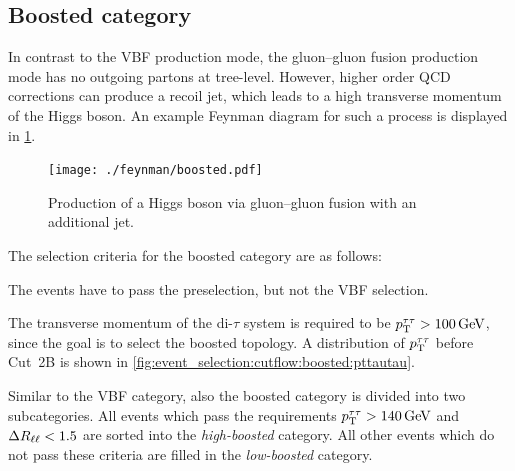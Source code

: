 

\subsection{Boosted category}\label{sub:event_selection:boosted}

In contrast to the VBF production mode, the gluon--gluon fusion production mode has no outgoing partons at tree-level.
However, higher order QCD corrections can produce a recoil jet, which leads to a high transverse momentum of the Higgs boson.
An example Feynman diagram for such a process is displayed in \cref{fig:event_selection:boostedjet}.

\begin{figure}[htb]
    \centering
    \texttt{[image: ./feynman/boosted.pdf]}
    \caption{Production of a Higgs boson via gluon--gluon fusion with an additional jet.}\label{fig:event_selection:boostedjet}
\end{figure}


The selection criteria for the boosted category are as follows:
\begin{description}[style=nextline,leftmargin=1cm]
    \item[(1B) Veto on VBF selection]
        The events have to pass the preselection, but not the VBF selection.
    \item[(2B) Higgs boson transverse momentum]
        The transverse momentum of the di-$\tau$ system is required to be $\pt^{\tau\tau} > \SI{100}{\GeV}$, since
        the goal is to select the boosted topology.
        A distribution of $p_\text{T}^{\tau\tau}$ before Cut~2B is shown in \cref{fig:event_selection:cutflow:boosted:pttautau}.
\end{description}
Similar to the VBF category, also the boosted category is divided into two subcategories.
All events which pass the requirements $\pt^{\tau\tau} > \SI{140}{\GeV}$ and $\Delta R_{\ell\ell} < 1.5$ are sorted
into the \emph{high-boosted} category. All other events which do not pass these criteria are filled in the
\emph{low-boosted} category.


